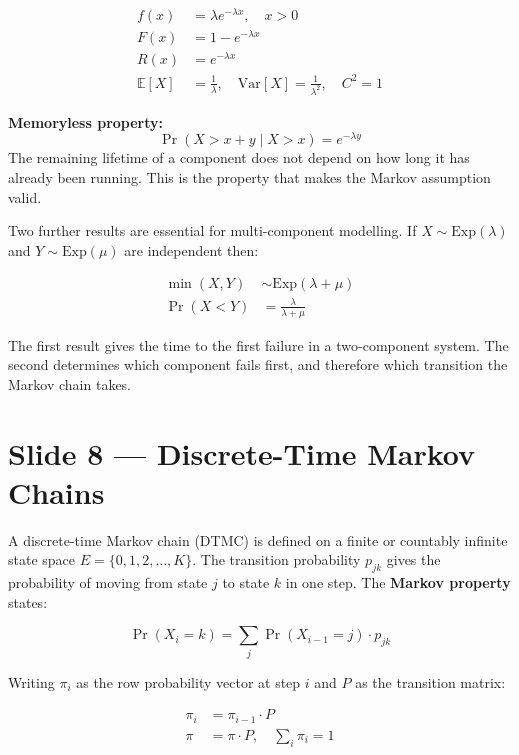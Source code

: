 \begin{align}
    f(x)   &= \lambda e^{-\lambda x}, \quad x > 0 
             \tag{density} \\[4pt]
    F(x)   &= 1 - e^{-\lambda x} 
             \tag{CDF} \\[4pt]
    R(x)   &= e^{-\lambda x} 
             \tag{Reliability function} \\[4pt]
    \mathbb{E}[X] &= \frac{1}{\lambda}, \quad 
    \mathrm{Var}[X] = \frac{1}{\lambda^2}, \quad C^2 = 1
\end{align}

\begin{notebox}
    \textbf{Memoryless property:}
    \[
        \Pr(X > x + y \mid X > x) = e^{-\lambda y}
    \]
    The remaining lifetime of a component does not depend on how long it 
    has already been running. This is the property that makes the Markov 
    assumption valid.
\end{notebox}

Two further results are essential for multi-component modelling. If 
$X \sim \mathrm{Exp}(\lambda)$ and $Y \sim \mathrm{Exp}(\mu)$ are 
independent then:

\begin{align}
    \min(X, Y) &\sim \mathrm{Exp}(\lambda + \mu) \\[6pt]
    \Pr(X < Y) &= \frac{\lambda}{\lambda + \mu}
\end{align}

The first result gives the time to the first failure in a two-component 
system. The second determines which component fails first, and therefore 
which transition the Markov chain takes.
\section*{Slide 8 — Discrete-Time Markov Chains}

A discrete-time Markov chain (DTMC) is defined on a finite or countably 
infinite state space $E = \{0, 1, 2, \ldots, K\}$. The transition 
probability $p_{jk}$ gives the probability of moving from state $j$ to 
state $k$ in one step. The \textbf{Markov property} states:

\[
    \Pr(X_i = k) = \sum_j \Pr(X_{i-1} = j) \cdot p_{jk}
\]

Writing $\pi_i$ as the row probability vector at step $i$ and $P$ as the 
transition matrix:

\begin{align}
    \pi_i &= \pi_{i-1} \cdot P \tag{transient} \\[6pt]
    \pi   &= \pi \cdot P, \quad \sum_i \pi_i = 1 \tag{steady state}
\end{align}

